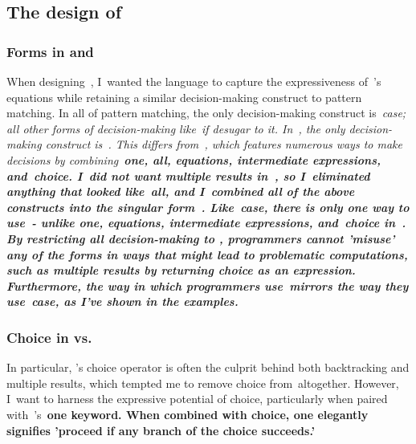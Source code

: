 \documentclass[manuscript,screen 12pt, nonacm]{acmart}
\begin{document}
    

    \subsection{The design of~\VMinus}
    
    \subsubsection{Forms in \VC and \VMinus}
    
    When designing~\VMinus, I~wanted the language to capture the expressiveness
    of~\VC's equations while retaining a similar decision-making construct to
    pattern matching. In all of pattern matching, the only decision-making
    construct is~\it{case}; all other forms of decision-making like~\it{if}
    desugar to it. In~\VMinus, the only decision-making construct is~\iffibf.
    This differs from~\VC, which features numerous ways to make decisions by
    combining~\bf{one}, \bf{all}, equations, intermediate expressions,
    and~choice. I~did not want multiple results in~\VMinus, so I~eliminated
    anything that looked like~\bf{all}, and I~combined all of the above
    constructs into the singular form~\iffibf. Like~\it{case}, there is only one
    way to use~\iffibf- unlike \bf{one}, equations, intermediate expressions,
    and~choice in~\VC. By restricting all decision-making to \iffibf,
    programmers cannot 'misuse' any of the forms in ways that might lead to
    problematic computations, such as multiple results by returning choice as an
    expression. Furthermore, the way in which programmers use~\iffibf mirrors
    the way they use~\it{case}, as I've shown in the examples. 
    
    \subsubsection{Choice in \VMinus vs. \VC}

    In particular, \VC's choice operator is often the culprit behind both
    backtracking and multiple results, which tempted me to remove choice
    from~\VMinus altogether. However, I~want to harness the expressive potential
    of choice, particularly when paired with~\VC's~\bf{one} keyword. When
    combined with choice, \bf{one} elegantly signifies 'proceed if any branch of
    the choice succeeds.' 
    
\end{document}
